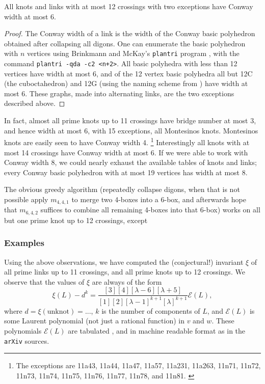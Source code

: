 \documentclass[12pt]{amsart}
\begin{document}
\begin{lemma}
All knots and links with at most 12 crossings with two exceptions 
have Conway width at most 6.
\end{lemma}
\begin{proof}
The Conway width of a link is the width of the Conway basic polyhedron 
obtained after collapsing all digons. One can enumerate the basic polyhedron
with $n$ vertices using Brinkmann and McKay's {\tt plantri} program
\cite{MR2357364,MR2186681}, with the command {\tt plantri -qda -c2 <n+2>}. 
All basic polyhedra with less than 12 vertices have width at most 6, and of 
the 12 vertex basic polyhedra all but 12C (the cuboctahedron) and 12G (using 
the naming scheme from \cite{MR679310}) have width at most 6. These graphs,
made into alternating links, are the two exceptions described above.
\end{proof}
In fact, almost all prime knots up to 11 crossings have bridge number 
at most 3, and hence width at most 6, with 15 exceptions, all Montesinos
knots. Montesinos knots are easily seen to have Conway width 4.%
\footnote{The exceptions are 11a43, 11a44, 11a47, 11a57, 11a231,
  11a263, 11n71, 11n72, 11n73, 11n74, 11n75, 11n76, 11n77, 11n78, and
  11n81. \cite{1208.4233}}
Interestingly all knots with at most 14 crossings have Conway width at most 6.
If we were able to work with Conway width 8, we could nearly exhaust the 
available tables of knots and links; every Conway basic polyhedron with at 
most 19 vertices has width at most 8.

The obvious greedy algorithm (repeatedly collapse digons, when that is not 
possible apply $m_{4,4,1}$ to merge two 4-boxes into a 6-box, and afterwards
hope that $m_{6,4,2}$  suffices to combine all remaining 4-boxes into that
6-box) works on all but one prime knot up to 12 crossings, except 

\subsubsection{Examples}
Using the above observations, we have computed the (conjectural!) 
invariant $\xi$ of all prime links up to 11 crossings, and all prime knots up
to 12 crossings. We observe that the values of $\xi$ are always of the form
$$\xi(L) - d^{k} = 
\frac{[3][4][\lambda-6][\lambda+5]}{[1][2][\lambda-1]^{k+1} [\lambda]^{k+1}} \mathcal E(L),$$
where $d = \xi(\textrm{unknot}) = ...$, $k$ is the number of components of $L$, 
and $\mathcal E(L)$ is some Laurent polynomial (not just a rational function)
in $v$ and $w$. These polynomials $\mathcal E (L)$ are tabulated
, and in machine readable format as  in the {\tt arXiv} sources.
\end{document}
